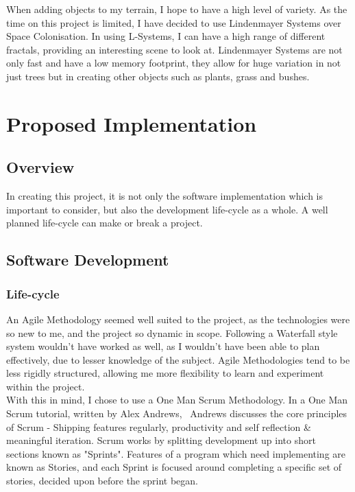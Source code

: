 \documentclass[a4paper,10pt]{report}
\begin{document}
When adding objects to my terrain, I hope to have a high level of variety. As the time on this project is limited, I have decided to use Lindenmayer Systems over Space Colonisation. In using L-Systems, I can have a high range of different fractals, providing an interesting scene to look at. Lindenmayer Systems are not only fast and have a low memory footprint, they allow for huge variation in not just trees but in creating other objects such as plants, grass and bushes. 

\section{Proposed Implementation}
\subsection{Overview}

In creating this project, it is not only the software implementation which is important to consider, but also the development life-cycle as a whole. A well planned life-cycle can make or break a project. 

\subsection{Software Development}
\subsubsection{Life-cycle}

An Agile Methodology seemed well suited to the project, as the technologies were so new to me, and the project so dynamic in scope. Following a Waterfall style system wouldn't have worked as well, as I wouldn't have been able to plan effectively, due to lesser knowledge of the subject. Agile Methodologies tend to be less rigidly structured, allowing me more flexibility to learn and experiment within the project. \\

With this in mind, I chose to use a One Man Scrum Methodology. In a One Man Scrum tutorial, written by Alex Andrews,~\cite{andrews_2017} Andrews discusses the core principles of Scrum - Shipping features regularly, productivity and self reflection \& meaningful iteration. Scrum works by splitting development up into short sections known as "Sprints". Features of a program which need implementing are known as Stories, and each Sprint is focused around completing a specific set of stories, decided upon before the sprint began. \\
\end{document}
